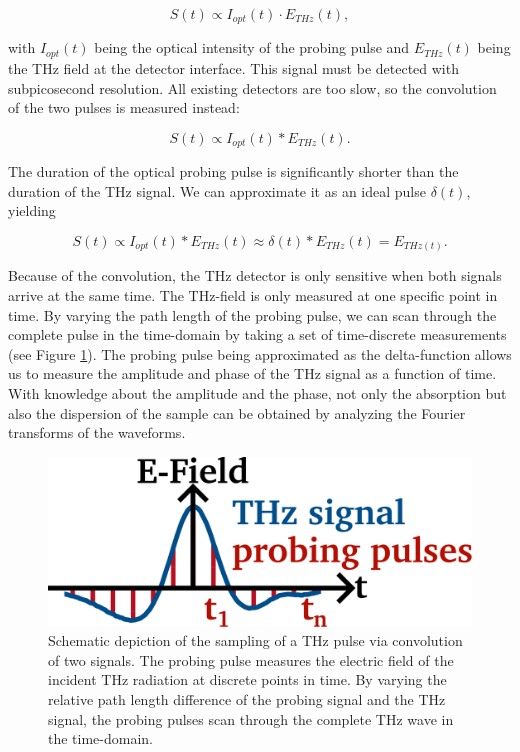 \begin{equation}
	S(t) \propto I_{opt}(t)\cdot E_{THz}(t),
\end{equation}

with $I_{opt}(t)$ being the optical intensity of the probing pulse and $E_{THz}(t)$ being the THz field at the detector interface. This signal must be detected with subpicosecond resolution. All existing detectors are too slow, so the convolution of the two pulses is measured instead: 

\begin{equation}
	S(t) \propto I_{opt}(t) \ast E_{THz}(t).
\end{equation}

The duration of the optical probing pulse is significantly shorter than the duration of the THz signal. We can approximate it as an ideal pulse $\delta(t)$, yielding

\begin{equation}
	S(t) \propto I_{opt}(t) \ast E_{THz}(t) \approx \delta(t) \ast E_{THz}(t) = E_{THz(t)}.
\end{equation}

Because of the convolution, the THz detector is only sensitive when both signals arrive at the same time. The THz-field is only measured at one specific point in time. By varying the path length of the probing pulse, we can scan through the complete pulse in the time-domain by taking a set of time-discrete measurements (see Figure \ref{fig:convo}). The probing pulse being approximated as the delta-function allows us to measure the amplitude and phase of the THz signal as a function of time. With knowledge about the amplitude and the phase, not only the absorption but also the dispersion of the sample can be obtained by analyzing the Fourier transforms of the waveforms. 

\begin{figure}[!]
  \centering
    \centering
    \includegraphics[width=0.4\linewidth]{figures/theory/TDS_basics.pdf}
    \caption{Schematic depiction of the sampling of a THz pulse via convolution of two signals. The probing pulse measures the electric field of the incident THz radiation at discrete points in time. By varying the relative path length difference of the probing signal and the THz signal, the probing pulses scan through the complete THz wave in the time-domain.} 
    \label{fig:convo}
\end{figure}